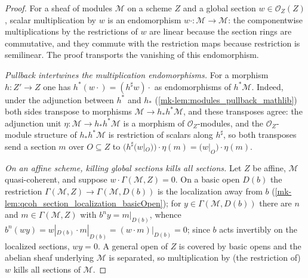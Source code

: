 \begin{proof}
  \leanok{}
  For a sheaf of modules \(\mathcal{M}\) on a scheme \(Z\) and a global
  section \(w \in \mathcal{O}_Z(Z)\), scalar multiplication by \(w\) is an
  endomorphism \(w \cdot : \mathcal{M} \to \mathcal{M}\): the componentwise
  multiplications by the restrictions of \(w\) are linear because the section
  rings are commutative, and they commute with the restriction maps because
  restriction is semilinear.  The proof transports the vanishing of this
  endomorphism.

  \emph{Pullback intertwines the multiplication endomorphisms.}  For a
  morphism \(h : Z' \to Z\) one has \(h^*(w \cdot) = (h^\sharp w) \cdot\) as
  endomorphisms of \(h^* \mathcal{M}\).  Indeed, under the adjunction between
  \(h^*\) and \(h_*\) (\ref{mk-lem:modules_pullback_mathlib}) both sides
  transpose to morphisms \(\mathcal{M} \to h_* h^* \mathcal{M}\), and these
  transposes agree: the adjunction unit
  \(\eta : \mathcal{M} \to h_* h^* \mathcal{M}\) is a morphism of
  \(\mathcal{O}_Z\)-modules, and the \(\mathcal{O}_Z\)-module structure of
  \(h_* h^* \mathcal{M}\) is restriction of scalars along \(h^\sharp\), so
  both transposes send a section \(m\) over \(O \subseteq Z\) to
  \(\bigl(h^\sharp(w|_O)\bigr) \cdot \eta(m) = \bigl(w|_O\bigr) \cdot
  \eta(m)\).

  \emph{On an affine scheme, killing global sections kills all sections.}
  Let \(Z\) be affine, \(\mathcal{M}\) quasi-coherent, and suppose
  \(w \cdot \Gamma(\mathcal{M}, Z) = 0\).  On a basic open \(D(b)\) the
  restriction \(\Gamma(\mathcal{M}, Z) \to \Gamma(\mathcal{M}, D(b))\) is the
  localization away from \(b\)
  (\ref{mk-lem:qcoh_section_localization_basicOpen}); for
  \(y \in \Gamma(\mathcal{M}, D(b))\) there are \(n\) and
  \(m \in \Gamma(\mathcal{M}, Z)\) with \(b^n y = m|_{D(b)}\), whence
  \(b^n (w y) = w|_{D(b)} \cdot m|_{D(b)} = (w \cdot m)|_{D(b)} = 0\); since
  \(b\) acts invertibly on the localized sections, \(w y = 0\).  A general
  open of \(Z\) is covered by basic opens and the abelian sheaf underlying
  \(\mathcal{M}\) is separated, so multiplication by (the restriction of)
  \(w\) kills all sections of \(\mathcal{M}\).


\end{proof}
